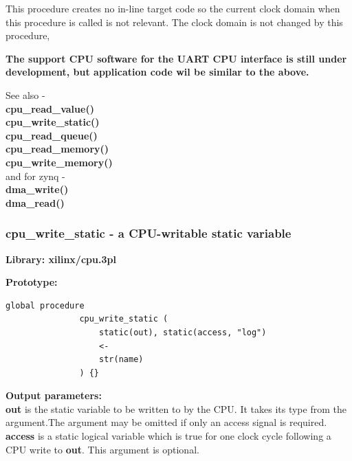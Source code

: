             This procedure creates no in-line target code so the current clock domain
            when this procedure is called is not relevant. The clock domain is not
            changed by this procedure,
            
            {\bf The support CPU software for the UART CPU interface is still
            under development, but application code wil be similar to the
            above.}

            See also - \\
            {\bf cpu\_read\_value()}  \\
            {\bf cpu\_write\_static()}  \\
            {\bf cpu\_read\_queue()}  \\
            {\bf cpu\_read\_memory()}  \\
            {\bf cpu\_write\_memory()}  \\
            and for zynq -\\
            {\bf dma\_write()}  \\
            {\bf dma\_read()}  \\


            

            
                
        \subsubsection{cpu\_write\_static - a CPU-writable static
                                            variable}\label{sec:lpcpuwrstat}

            {\bf Library: xilinx/cpu.3pl}

            {\bf Prototype:} \\
            \vsp
            \begin{lstlisting}[gobble=12, language=threepl]
               global procedure
               cpu_write_static (
                   static(out), static(access, "log")
                   <-
                   str(name)
               ) {}
            \end{lstlisting}

            {\bf Output parameters:} \\
            {\bf out} is the static variable to be written to by the CPU. It
            takes its type from the argument.The argument may be omitted if only an access signal is
            required.\\
            {\bf access} is a static logical variable which is true for one
            clock cycle following a CPU write to {\bf out}. This argument is
            optional.\\

